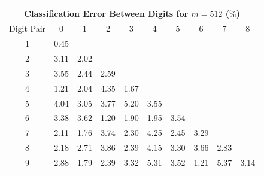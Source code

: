 \documentclass{article}[12pt]
\begin{document}
\begin{enumerate}
\begin{table}[h]
\centering
\begin{tabular}{|c||c|c|c|c|c|c|c|c|c|} \hline
\multicolumn{10}{|c|}{Classification Error Between Digits for $m=512$ ($\%$)} \\ \hline
Digit Pair &0& 1& 2& 3& 4& 5& 6& 7& 8 \\ \hline \hline
1 &0.45  & & & & & & & & \\ \hline
2 &3.11  &2.02  & & & & & & &\\ \hline
3 &3.55  &2.44  &2.59  & & & &  & &\\ \hline
4 &1.21  &2.04  &4.35  &1.67  & & & &  &\\ \hline
5 &4.04  &3.05  &3.77  &5.20  &3.55  & &  & &\\ \hline
6 &3.38  &3.62  &1.20  &1.90  &1.95  &3.54  & & &\\ \hline
7 &2.11  &1.76  &3.74  &2.30  &4.25  &2.45  &3.29  &  &\\ \hline
8 &2.18  &2.71  &3.86  &2.39  &4.15  &3.30  &3.66  &2.83   &\\ \hline
9 &2.88  &1.79  &2.39  &3.32  &5.31  &3.52  &1.21  &5.37  &3.14  \\ \hline
\end{tabular}
\end{table}
\end{enumerate}
\end{document}
